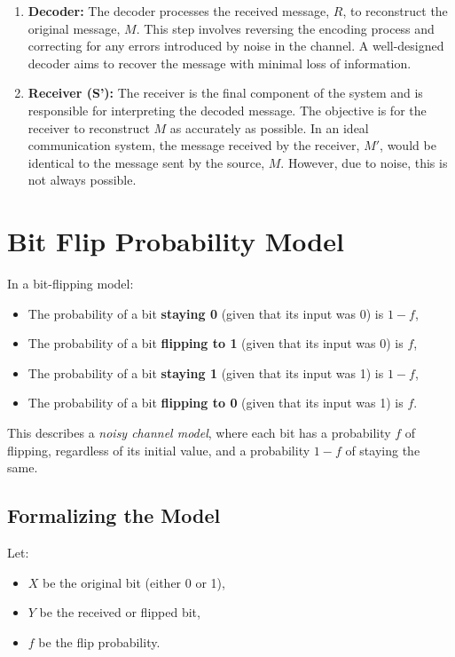 \documentclass{article}
\begin{document}
\begin{enumerate}
    \item \textbf{Decoder:}
    The decoder processes the received message, \( R \), to reconstruct the original message, \( M \). This step involves reversing the encoding process and correcting for any errors introduced by noise in the channel. A well-designed decoder aims to recover the message with minimal loss of information.

    \item \textbf{Receiver (S'):}
    The receiver is the final component of the system and is responsible for interpreting the decoded message. The objective is for the receiver to reconstruct \( M \) as accurately as possible. In an ideal communication system, the message received by the receiver, \( M' \), would be identical to the message sent by the source, \( M \). However, due to noise, this is not always possible.
\end{enumerate}

\section{Bit Flip Probability Model}

In a bit-flipping model:

\begin{itemize}
    \item The probability of a bit \textbf{staying 0} (given that its input was 0) is \( 1 - f \),
    \item The probability of a bit \textbf{flipping to 1} (given that its input was 0) is \( f \),
    \item The probability of a bit \textbf{staying 1} (given that its input was 1) is \( 1 - f \),
    \item The probability of a bit \textbf{flipping to 0} (given that its input was 1) is \( f \).
\end{itemize}

This describes a \textit{noisy channel model}, where each bit has a probability \( f \) of flipping, regardless of its initial value, and a probability \( 1 - f \) of staying the same.

\subsection{Formalizing the Model}

Let:
\begin{itemize}
    \item \( X \) be the original bit (either 0 or 1),
    \item \( Y \) be the received or flipped bit,
    \item \( f \) be the flip probability.
\end{itemize}
\end{document}
